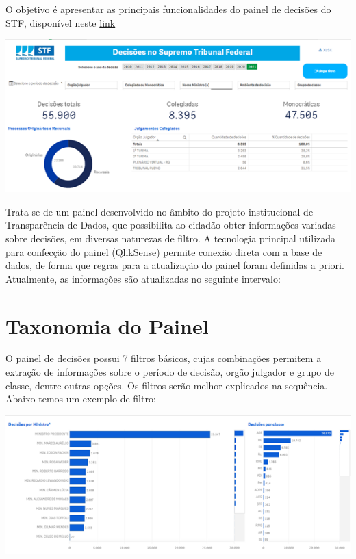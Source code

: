 \documentclass[
]{book}
\begin{document}
O objetivo é apresentar as principais funcionalidades do painel de decisões do STF, disponível neste \href{https://transparencia.stf.jus.br/single/?appid=1f9aa2cf-d569-4e98-bd2a-a9dac4e79a69\&sheet=3490ef1f-f90e-4b51-9b93-b578efd54efd\&theme=simplicity\&opt=currsel\&select=clearall}{link}

\begin{center}\includegraphics[width=0.8\linewidth,height=0.95\textheight]{imagens/imagem_1_decisoes} \end{center}

Trata-se de um painel desenvolvido no âmbito do projeto institucional de Transparência de Dados, que possibilita ao cidadão obter informações variadas sobre decisões, em diversas naturezas de filtro. A tecnologia principal utilizada para confecção do painel (QlikSense) permite conexão direta com a base de dados, de forma que regras para a atualização do painel foram definidas a priori. Atualmente, as informações são atualizadas no seguinte intervalo:

\hypertarget{taxonomia-do-painel-1}{%
\section{Taxonomia do Painel}\label{taxonomia-do-painel-1}}

O painel de decisões possui 7 filtros básicos, cujas combinações permitem a extração de informações sobre o período de decisão, orgão julgador e grupo de classe, dentre outras opções. Os filtros serão melhor explicados na sequência. Abaixo temos um exemplo de filtro:

\begin{center}\includegraphics[width=0.8\linewidth,height=0.95\textheight]{imagens/imagem_2_decisoes} \end{center}
\end{document}
